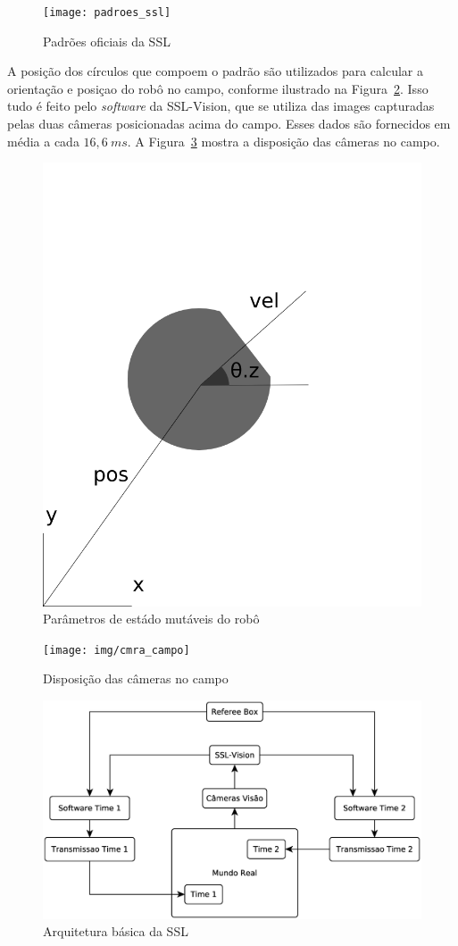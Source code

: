 \begin{figure}[thpb]
  \centering
  \texttt{[image: padroes\_ssl]}
  \caption{Padrões oficiais da SSL~\cite{zickler-ssl}}\label{fig:padroes_ssl}
\end{figure}

A posição dos círculos que compoem o padrão são utilizados para calcular a orientação
e posiçao do robô no campo, conforme ilustrado na Figura~\ref{fig:rob_data}. Isso
tudo é feito pelo \textit{software} da SSL-Vision, que se utiliza das images capturadas
pelas duas câmeras posicionadas acima do campo. Esses dados são fornecidos em média a
cada $16,6{\ }ms$. A Figura~\ref{fig:cmra_campo} mostra a disposição das câmeras no
campo.

\begin{figure}[thpb]
  \centering
  \includegraphics[width=0.5\linewidth]{img/rob_data}
  \caption{Parâmetros de estádo mutáveis do robô}\label{fig:rob_data}
\end{figure}

\begin{figure}[thpb]
  \centering
  \texttt{[image: img/cmra\_campo]}
  \caption{Disposição das câmeras no campo}\label{fig:cmra_campo}
\end{figure}

\begin{figure}[thpb]
  \centering
  \includegraphics[width= 0.8\linewidth]{img/arq_ssl}
  \caption{Arquitetura básica da SSL}\label{fig:arquitetura_ssl}
\end{figure}

